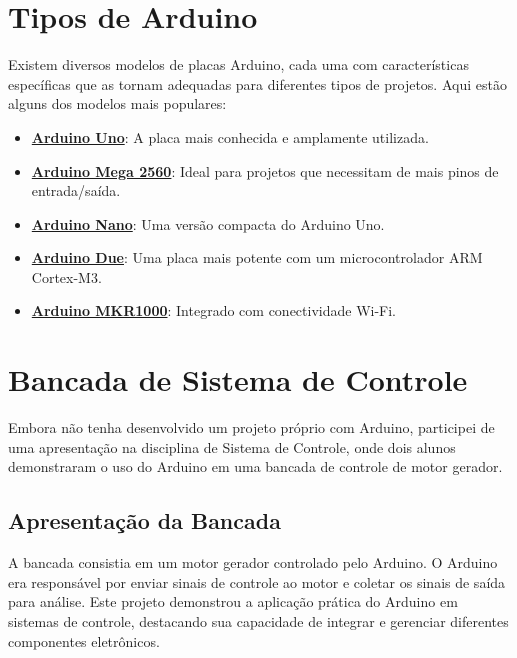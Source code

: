 \documentclass[
]{book}
\providecommand{\tightlist}{%
  \setlength{\itemsep}{0pt}\setlength{\parskip}{0pt}}
\begin{document}
\section{Tipos de Arduino}\label{tipos-de-arduino}

Existem diversos modelos de placas Arduino, cada uma com características específicas que as tornam adequadas para diferentes tipos de projetos. Aqui estão alguns dos modelos mais populares:

\begin{itemize}
\tightlist
\item
  \textbf{\href{https://store.arduino.cc/arduino-uno-rev3}{Arduino Uno}}: A placa mais conhecida e amplamente utilizada.
\item
  \textbf{\href{https://store.arduino.cc/arduino-mega-2560-rev3}{Arduino Mega 2560}}: Ideal para projetos que necessitam de mais pinos de entrada/saída.
\item
  \textbf{\href{https://store.arduino.cc/arduino-nano}{Arduino Nano}}: Uma versão compacta do Arduino Uno.
\item
  \textbf{\href{https://store.arduino.cc/arduino-due}{Arduino Due}}: Uma placa mais potente com um microcontrolador ARM Cortex-M3.
\item
  \textbf{\href{https://store.arduino.cc/arduino-mkr1000}{Arduino MKR1000}}: Integrado com conectividade Wi-Fi.
\end{itemize}

\section{Bancada de Sistema de Controle}\label{bancada-de-sistema-de-controle}

Embora não tenha desenvolvido um projeto próprio com Arduino, participei de uma apresentação na disciplina de Sistema de Controle, onde dois alunos demonstraram o uso do Arduino em uma bancada de controle de motor gerador.

\subsection{Apresentação da Bancada}\label{apresentauxe7uxe3o-da-bancada}

A bancada consistia em um motor gerador controlado pelo Arduino. O Arduino era responsável por enviar sinais de controle ao motor e coletar os sinais de saída para análise. Este projeto demonstrou a aplicação prática do Arduino em sistemas de controle, destacando sua capacidade de integrar e gerenciar diferentes componentes eletrônicos.
\end{document}
